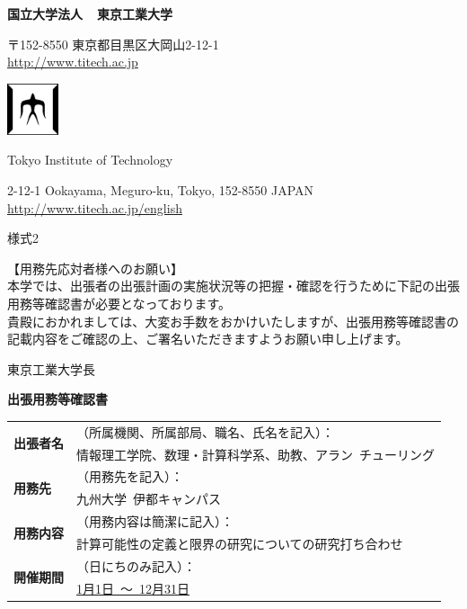 \documentclass[a4paper,11pt]{memoir}
\newcommand{\name}{情報理工学院、数理・計算科学系、助教、アラン~チューリング}
\newcommand{\place}{九州大学~伊都キャンパス}
\newcommand{\work}{計算可能性の定義と限界の研究についての研究打ち合わせ}
\newcommand{\period}{1月1日~〜~12月31日}
\begin{document}
\sffamily

\parbox[b][2.5em][t]{61mm}{
{\bfseries 国立大学法人~~東京工業大学}

\vspace{.5em}
\tiny
〒152-8550  東京都目黒区大岡山2-12-1\\
\url{http://www.titech.ac.jp}
}
\hfill
\includegraphics[width=15mm]{titech.eps}
\hfill
\parbox[b][2.5em][t]{61mm}{
Tokyo Institute of Technology

\vspace{.5em}
\tiny
2-12-1 Ookayama, Meguro-ku, Tokyo, 152-8550 JAPAN\\
\url{http://www.titech.ac.jp/english}
}

\hrulefill


\hfill
{\large 様式2}

\vspace{1em}
\small
【用務先応対者様へのお願い】\\
本学では、出張者の出張計画の実施状況等の把握・確認を行うために下記の出張用務等確認書が必要となっております。\\
貴殿におかれましては、大変お手数をおかけいたしますが、出張用務等確認書の記載内容をご確認の上、ご署名いただきますようお願い申し上げます。

\hfill 東京工業大学長

\vspace{1em}
\small

\sffamily
\centering
{\Large
\bfseries
出張用務等確認書
}

\vspace{2em}
\scriptsize
\begin{tabular}{|l|p{145mm}|}
\hline
\multirow{2}{*}{\bfseries 出張者名} & （所属機関、所属部局、職名、氏名を記入）：\\ \cline{2-2}
&\normalsize\name\\[1.0ex] \cline{2-2}
\multirow{2}{*}{\bfseries 用務先} & （用務先を記入）：\\ \cline{2-2}
&\normalsize\place\\[1.0ex] \cline{2-2}
\multirow{2}{*}{\bfseries 用務内容} & （用務内容は簡潔に記入）：\\ \cline{2-2}
&\normalsize\work\\[5ex] \hline
\multirow{2}{*}{\bfseries 開催期間} & （日にちのみ記入）：\\ \cline{2-2}
&
\normalsize\underline{\period}\\ \hline
\end{tabular}
\end{document}
